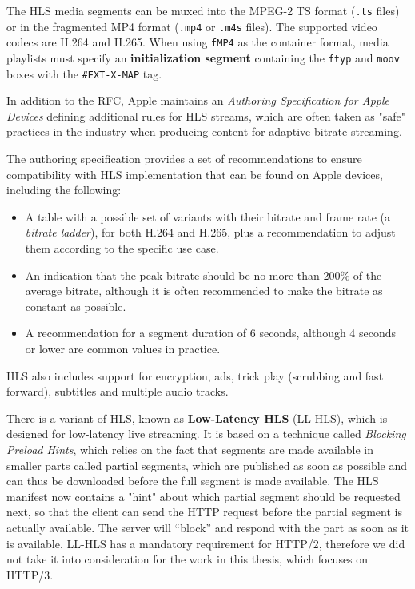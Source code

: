 The HLS media segments can be muxed into the MPEG-2 TS format (\texttt{.ts} files) or in the fragmented MP4 format (\texttt{.mp4} or \texttt{.m4s} files). The supported video codecs are H.264 and H.265. When using \texttt{fMP4} as the container format, media playlists must specify an \textbf{initialization segment} containing the \texttt{ftyp} and \texttt{moov} boxes with the \texttt{\#EXT-X-MAP} tag.

In addition to the RFC, Apple maintains an \textit{Authoring Specification for Apple Devices} defining additional rules for HLS streams, which are often taken as "safe" practices in the industry when producing content for adaptive bitrate streaming.\cite{hlsauthoring}

The authoring specification provides a set of recommendations to ensure compatibility with HLS implementation that can be found on Apple devices, including the following:

\begin{itemize}
    \item A table with a possible set of variants with their bitrate and frame rate (a \textit{bitrate ladder}), for both H.264 and H.265, plus a recommendation to adjust them according to the specific use case.
    \item An indication that the peak bitrate should be no more than 200\% of the average bitrate, although it is often recommended to make the bitrate as constant as possible.\cite{ozer}
    \item A recommendation for a segment duration of 6 seconds, although 4 seconds or lower are common values in practice.\cite{ozer}
\end{itemize}

HLS also includes support for encryption, ads, trick play (scrubbing and fast forward), subtitles and multiple audio tracks.

There is a variant of HLS, known as \textbf{Low-Latency HLS} (LL-HLS), which is designed for low-latency live streaming. It is based on a technique called \textit{Blocking Preload Hints}, which relies on the fact that segments are made available in smaller parts called partial segments, which are published as soon as possible and can thus be downloaded before the full segment is made available. The HLS manifest now contains a "hint" about which partial segment should be requested next, so that the client can send the HTTP request before the partial segment is actually available. The server will “block” and respond with the part as soon as it is available. LL-HLS has a mandatory requirement for HTTP/2, therefore we did not take it into consideration for the work in this thesis, which focuses on HTTP/3.

